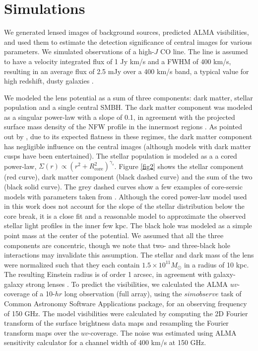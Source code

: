 \documentclass[chicago]{emulateapj}
\begin{document}
\section{Simulations}
We generated lensed images of background sources, predicted ALMA visibilities, and used them to estimate the detection significance of central images for various parameters. We simulated observations of a high-$J$ CO line. The line is assumed to have a velocity integrated flux of 1 Jy km/s and a FWHM of 400 km/s, resulting in an average flux of 2.5 mJy over a 400 km/s band, a typical value for high redshift, dusty galaxies \citep{Bothwell:12}. 

We modeled the lens potential as a sum of three components: dark matter, stellar population and a single central SMBH. The dark matter component was modeled as a singular power-law with a slope of 0.1, in agreement with the projected surface mass density of the NFW profile in the innermost regions \citep{Golse:02}. As  pointed out by \citet{Keeton:03}, due to its expected flatness in these regimes, the dark matter component has negligible influence on the central images (although models with dark matter cusps have been entertained). 
The stellar population is modeled as a a cored power-law, $\Sigma(r)\propto (r^2+R_{\mathrm{core}}^2)^{\gamma_s}$. Figure \ref{fig2} shows the stellar component (red curve), dark matter component (black dashed curve) and the sum of the two (black solid curve). The grey dashed curves show a few examples of core-sersic models with parameters taken from \citet{Ferrarese:06}. Although the cored power-law model used in this work does not account for the slope of the stellar distribution below the core break, it is a close fit and a reasonable model to approximate the observed stellar light profiles in the inner few kpc. 
The black hole was modeled as a simple point mass at the center of the potential. We assumed that all the three components are concentric, though we note that two- and three-black hole interactions may invalidate this assumption.
The stellar and dark mass of the lens were normalized such that they each contain $1.5\times10^{11} M_{\odot}$ in a radius of 10 kpc. The resulting Einstein radius is of order 1 arcsec, in agreement with galaxy-galaxy strong lenses \citep[e.g.,][]{hezaveh:13b}.
To predict the visibilities, we calculated the ALMA $uv$-coverage of a 10-$hr$ long observation (full array), using the $simobserve$ task of Common Astronomy Software Applications package, for an observing frequency of 150 GHz. 
The model visibilities were calculated by computing the 2D Fourier transform of the surface brightness data maps and resampling the Fourier transform maps over the $uv$-coverage. 
The noise was estimated using ALMA sensitivity calculator for a channel width of 400 km/s at 150 GHz. 
\end{document}

